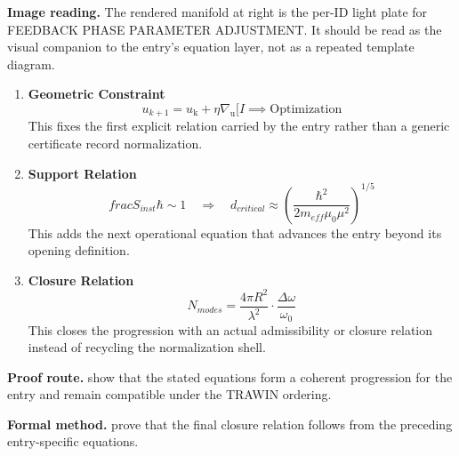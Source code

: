 \begin{samepage}
\noindent\begin{minipage}[t]{0.45\linewidth}
\vspace{0pt}
\raggedright
\scriptsize\textbf{Image reading.} The rendered manifold at right is the per-ID light plate for FEEDBACK PHASE PARAMETER ADJUSTMENT. It should be read as the visual companion to the entry's equation layer, not as a repeated template diagram.\par
\end{minipage}\hfill
\begin{minipage}[t]{0.53\linewidth}
\vspace*{-0.10in}
\raggedright
{}
\end{minipage}
\end{samepage}

\clearpage


\begin{enumerate}[leftmargin=1.6em,itemsep=9pt,topsep=6pt]
\item \textbf{Geometric Constraint}
\[
u_{k+1} = u_{\mathrm{k}} + \eta \nabla_{\mathrm{u}} [I \implies \text{Optimization}
\]
This fixes the first explicit relation carried by the entry rather than a generic certificate record normalization.

\item \textbf{Support Relation}
\[
frac{S_{inst}}{\hbar} \sim 1 \quad \Rightarrow \quad d_{critical} \approx \left(\frac{\hbar^2}{2m_{eff}\mu_0\mu^2}\right)^{1/5}
\]
This adds the next operational equation that advances the entry beyond its opening definition.

\item \textbf{Closure Relation}
\[
N_{modes} = \frac{4\pi R^2}{\lambda^2} \cdot \frac{\Delta\omega}{\omega_0}
\]
This closes the progression with an actual admissibility or closure relation instead of recycling the normalization shell.
\end{enumerate}

\textbf{Proof route.} show that the stated equations form a coherent progression for the entry and remain compatible under the TRAWIN ordering.

\textbf{Formal method.} prove that the final closure relation follows from the preceding entry-specific equations.


